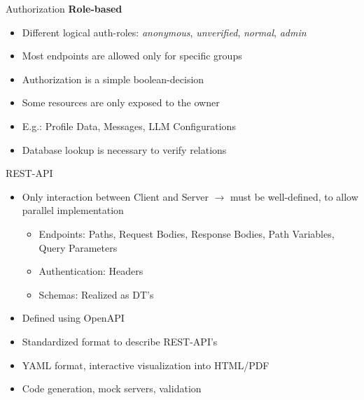 \documentclass{sdqbeamer}[en]
\begin{document}
\begin{frame}{Authorization}
    \textbf{Role-based}
    \begin{itemize}
        \item Different logical auth-roles: \textit{anonymous}, \textit{unverified}, \textit{normal}, \textit{admin}
        \item Most endpoints are allowed only for specific groups
        \item Authorization is a simple boolean-decision
    \end{itemize}
    \vspace{0.5em}
    \begin{itemize}
        \item<2-> Some resources are only exposed to the owner
        \item<2-> E.g.: Profile Data, Messages, LLM Configurations
        \item<2-> Database lookup is necessary to verify relations
    \end{itemize}
\end{frame}

\begin{frame}{REST-API}
    \begin{itemize}
        \item Only interaction between Client and Server $\rightarrow$ must be well-defined, to allow parallel implementation
        \begin{itemize}
            \item Endpoints: Paths, Request Bodies, Response Bodies, Path Variables, Query Parameters
            \item Authentication: Headers
            \item Schemas: Realized as DT's
        \end{itemize}
        \item Defined using OpenAPI
    \end{itemize}

    \vspace{0.5em}

    \begin{itemize}
        \item<2-> Standardized format to describe REST-API's
        \item<2-> YAML format, interactive visualization into HTML/PDF
        \item<2-> Code generation, mock servers, validation 
    \end{itemize}
\end{frame}
\end{document}
